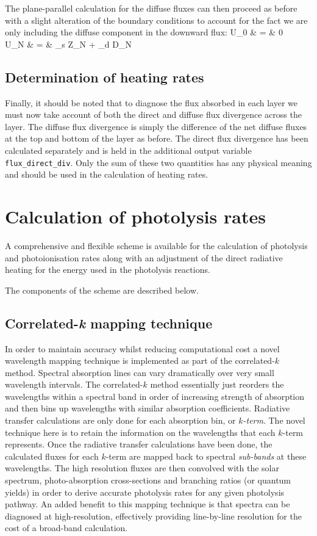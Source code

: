 \noindent
The plane-parallel calculation for the diffuse fluxes can then proceed as
before with a slight alteration of the boundary conditions to account for the
fact we are only including the diffuse component in the downward flux:
\beqn
U_0 & = & 0 \nonumber \\
U_{N} & = & \alpha_{s} Z_{N} + \alpha_{d} D_{N}
\eeqn 

\subsection{Determination of heating rates}

Finally, it should be noted that to diagnose the flux absorbed in each layer
we must now take account of both the direct and diffuse flux divergence across
the layer. The diffuse flux divergence is simply the difference of the net
diffuse fluxes at the top and bottom of the layer as before. The direct flux
divergence has been calculated separately and is held in the additional output
variable {\tt flux\_direct\_div}. Only the sum of these two quantities has any
physical meaning and should be used in the calculation of heating rates.


\section{Calculation of photolysis rates}

A comprehensive and flexible scheme is available for the calculation of
photolysis and photoionisation rates along with an adjustment of the direct
radiative heating for the energy used in the photolysis reactions.

The components of the scheme are described below.

\subsection{Correlated-\textit{k} mapping technique}
In order to maintain accuracy whilst reducing computational cost a novel wavelength mapping technique
is implemented as part of the correlated-$k$ method. Spectral absorption lines can vary dramatically over
very small wavelength intervals. The correlated-$k$ method essentially just reorders the wavelengths within
a spectral band in order of increasing strength of absorption and then bins up wavelengths with similar absorption
coefficients. Radiative transfer calculations are only done for each absorption bin, or {\em $k$-term}.
The novel technique here is to retain the information on the wavelengths that each $k$-term represents.
Once the radiative transfer calculations have been done, the calculated fluxes for each $k$-term are mapped
back to spectral {\em sub-bands} at these wavelengths. The high resolution fluxes are then convolved with the solar spectrum,
photo-absorption cross-sections and branching ratios (or quantum yields) in order to derive accurate photolysis
rates for any given photolysis pathway.
An added benefit to this mapping technique is that spectra can be diagnosed at high-resolution, effectively
providing line-by-line resolution for the cost of a broad-band calculation.

